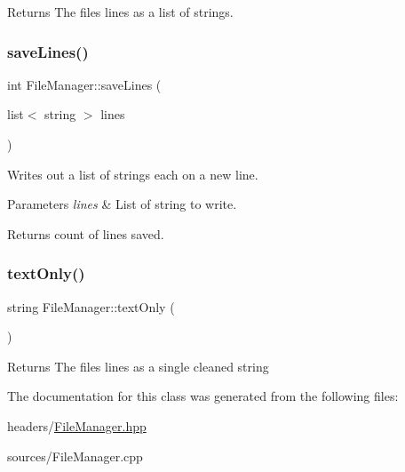 \begin{DoxyReturn}{Returns}
The file\textquotesingle{}s lines as a list of strings. 
\end{DoxyReturn}
\mbox{\label{classFileManager_a2ad30e54df4ffd2ca94b316ef43e1b1f}} 
\subsubsection{\texorpdfstring{save\+Lines()}{saveLines()}}
{\footnotesize\ttfamily int File\+Manager\+::save\+Lines (\begin{DoxyParamCaption}\item[{list$<$ string $>$}]{lines }\end{DoxyParamCaption})}

Writes out a list of strings each on a new line.


\begin{DoxyParams}{Parameters}
{\em lines} & List of string to write. \\
\hline
\end{DoxyParams}
\begin{DoxyReturn}{Returns}
count of lines saved. 
\end{DoxyReturn}
\mbox{\label{classFileManager_a92cce9f1145aaa39a52f4b991850d741}} 
\subsubsection{\texorpdfstring{text\+Only()}{textOnly()}}
{\footnotesize\ttfamily string File\+Manager\+::text\+Only (\begin{DoxyParamCaption}{ }\end{DoxyParamCaption})}

\begin{DoxyReturn}{Returns}
The file\textquotesingle{}s lines as a single cleaned string 
\end{DoxyReturn}


The documentation for this class was generated from the following files\+:\begin{DoxyCompactItemize}
\item 
headers/\hyperlink{FileManager_8hpp}{File\+Manager.\+hpp}\item 
sources/File\+Manager.\+cpp\end{DoxyCompactItemize}
